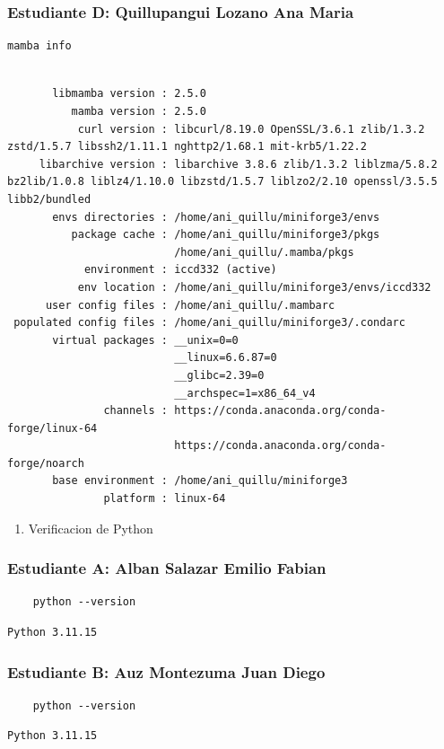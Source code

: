 \documentclass{article}
\begin{document}
\subsubsection{Estudiante D: Quillupangui Lozano Ana Maria}
\label{sec:org4db62ff}
\begin{verbatim}
mamba info
\end{verbatim}
\begin{verbatim}

       libmamba version : 2.5.0
          mamba version : 2.5.0
           curl version : libcurl/8.19.0 OpenSSL/3.6.1 zlib/1.3.2 zstd/1.5.7 libssh2/1.11.1 nghttp2/1.68.1 mit-krb5/1.22.2
     libarchive version : libarchive 3.8.6 zlib/1.3.2 liblzma/5.8.2 bz2lib/1.0.8 liblz4/1.10.0 libzstd/1.5.7 liblzo2/2.10 openssl/3.5.5 libb2/bundled
       envs directories : /home/ani_quillu/miniforge3/envs
          package cache : /home/ani_quillu/miniforge3/pkgs
                          /home/ani_quillu/.mamba/pkgs
            environment : iccd332 (active)
           env location : /home/ani_quillu/miniforge3/envs/iccd332
      user config files : /home/ani_quillu/.mambarc
 populated config files : /home/ani_quillu/miniforge3/.condarc
       virtual packages : __unix=0=0
                          __linux=6.6.87=0
                          __glibc=2.39=0
                          __archspec=1=x86_64_v4
               channels : https://conda.anaconda.org/conda-forge/linux-64
                          https://conda.anaconda.org/conda-forge/noarch
       base environment : /home/ani_quillu/miniforge3
               platform : linux-64
\end{verbatim}

\begin{enumerate}
\item Verificacion de Python
\end{enumerate}

\subsubsection{Estudiante A: Alban Salazar Emilio Fabian}
\label{sec:org9dcca1f}
\begin{verbatim}
    python --version
\end{verbatim}
\begin{verbatim}
Python 3.11.15
\end{verbatim}
\subsubsection{Estudiante B: Auz Montezuma Juan Diego}
\label{sec:orgd44c5db}
\begin{verbatim}
    python --version
\end{verbatim}
\begin{verbatim}
Python 3.11.15
\end{verbatim}
\end{document}
